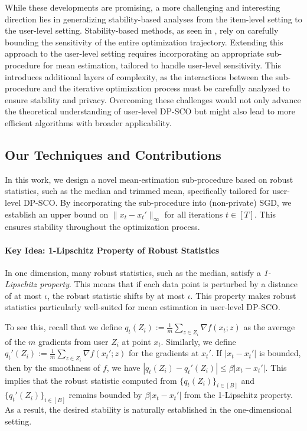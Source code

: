 While these developments are promising, a more challenging and interesting direction lies in generalizing stability-based analyses from the item-level setting to the user-level setting. Stability-based methods, as seen in \cite{FKT20}, rely on carefully bounding the sensitivity of the entire optimization trajectory. Extending this approach to the user-level setting requires incorporating an appropriate sub-procedure for mean estimation, tailored to handle user-level sensitivity. 
This introduces additional layers of complexity, as the interactions between the sub-procedure and the iterative optimization process must be carefully analyzed to ensure stability and privacy. Overcoming these challenges would not only advance the theoretical understanding of user-level DP-SCO but might also lead to more efficient algorithms with broader applicability.

\subsection{Our Techniques and Contributions}

In this work, we design a novel mean-estimation sub-procedure based on robust statistics, such as the median and trimmed mean, specifically tailored for user-level DP-SCO. By incorporating the sub-procedure into (non-private) SGD, we establish an upper bound on $\|x_t - x_t'\|_\infty$ for all iterations $t \in [T]$. This ensures stability throughout the optimization process.

\paragraph{Key Idea: 1-Lipschitz Property of Robust Statistics}  
In one dimension, many robust statistics, such as the median, satisfy a \textit{1-Lipschitz property}. This means that if each data point is perturbed by a distance of at most $\iota$, the robust statistic shifts by at most $\iota$. This property makes robust statistics particularly well-suited for mean estimation in user-level DP-SCO.

To see this, recall that we define  
$
q_t(Z_i) := \frac{1}{m} \sum_{z \in Z_i} \nabla f(x_t; z)
$  
as the average of the $m$ gradients from user $Z_i$ at point $x_t$. Similarly, we define  
$q_t'(Z_i) := \frac{1}{m} \sum_{z \in Z_i} \nabla f(x_t'; z)$  
for the gradients at $x_t'$.  
If $|x_t - x_t'|$ is bounded, then by the smoothness of $f$, we have  
$
|q_t(Z_i) - q_t'(Z_i)| \leq \beta |x_t - x_t'|.
$  
This implies that the robust statistic computed from $\{q_t(Z_i)\}_{i \in [B]}$ and $\{q_t'(Z_i)\}_{i \in [B]}$ remains bounded by $\beta |x_t - x_t'|$ from the 1-Lipschitz property. 
As a result, the desired stability is naturally established in the one-dimensional setting.

